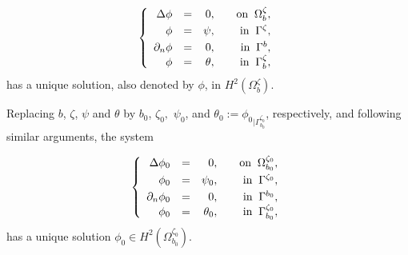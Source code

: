 \documentclass[11pt]{article}
\begin{document}
\begin{equation}\label{pd3}
	\left\{
	\begin{array}{rrrrr}
		\vspace{0.1cm}
		\Delta\phi &=&0,&\quad \text{on}\; \; \Omega_{b}^{\zeta},\\
		\vspace{0.1cm}
		\phi &=&\psi,&\quad \text{in}\;\;  \Gamma^{\zeta},\\
		\partial_n\phi &=&0,&\quad \text{in}\;\;\Gamma^{b},\\
		\phi &=&\theta ,&\quad \text{in}\;\;  \Gamma^{\zeta}_b,\\
	\end{array}
	\right.
\end{equation}
\vspace{0.2cm}
has a unique solution, also denoted by $\phi$, in $H^2(\Omega_b^{\zeta}).$

Replacing $b$, $\zeta$, $\psi$ and $\theta $ by  $b_0$, $\zeta_0,$ $\psi_0$, and $\theta _0 :={\phi _0}_{\vert \Gamma^{\zeta_0} _{b_0}}$, respectively, and following similar arguments, the system

\begin{equation}\label{pd4}
	\left\{
	\begin{array}{rrrrr}
		\vspace{0.1cm}
		\Delta\phi_0 &=&0,&\quad \text{on}\; \; \Omega_{b_0}^{\zeta_0},\\
		\vspace{0.1cm}
		\phi_0 &=&\psi_0,&\quad \text{in}\;\;  \Gamma^{\zeta_0},\\
		\partial_n\phi_0 &=&0,&\quad \text{in}\;\;\Gamma^{b_0},\\
		\phi _0 &=&\theta _0 ,&\quad \text{in}\;\;  \Gamma^{\zeta_0}_{b_0},\\
	\end{array}
	\right.
\end{equation}
has a  unique solution $\phi_0 \in H^2(\Omega_{b_0}^{\zeta_0}).$
\end{document}
